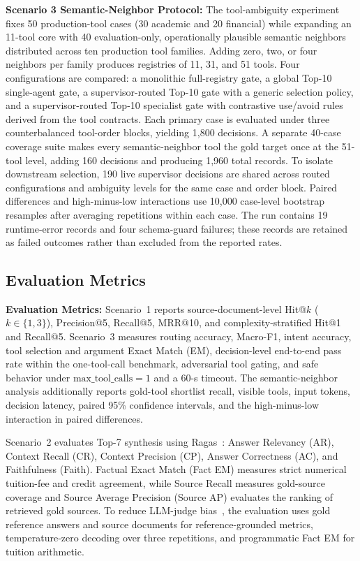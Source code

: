 \noindent\textbf{Scenario 3 Semantic-Neighbor Protocol:} The tool-ambiguity experiment fixes 50 production-tool cases (30 academic and 20 financial) while expanding an 11-tool core with 40 evaluation-only, operationally plausible semantic neighbors distributed across ten production tool families. Adding zero, two, or four neighbors per family produces registries of 11, 31, and 51 tools. Four configurations are compared: a monolithic full-registry gate, a global Top-10 single-agent gate, a supervisor-routed Top-10 gate with a generic selection policy, and a supervisor-routed Top-10 specialist gate with contrastive use/avoid rules derived from the tool contracts. Each primary case is evaluated under three counterbalanced tool-order blocks, yielding 1,800 decisions. A separate 40-case coverage suite makes every semantic-neighbor tool the gold target once at the 51-tool level, adding 160 decisions and producing 1,960 total records. To isolate downstream selection, 190 live supervisor decisions are shared across routed configurations and ambiguity levels for the same case and order block. Paired differences and high-minus-low interactions use 10,000 case-level bootstrap resamples after averaging repetitions within each case. The run contains 19 runtime-error records and four schema-guard failures; these records are retained as failed outcomes rather than excluded from the reported rates.

\subsection{Evaluation Metrics}
\label{sec:metrics}

\noindent\textbf{Evaluation Metrics:} Scenario~1 reports source-document-level Hit@$k$ ($k\in\{1,3\}$), Precision@5, Recall@5, MRR@10, and complexity-stratified Hit@1 and Recall@5. Scenario~3 measures routing accuracy, Macro-F1, intent accuracy, tool selection and argument Exact Match (EM), decision-level end-to-end pass rate within the one-tool-call benchmark, adversarial tool gating, and safe behavior under $\text{max\_tool\_calls}=1$ and a $60$-s timeout. The semantic-neighbor analysis additionally reports gold-tool shortlist recall, visible tools, input tokens, decision latency, paired 95\% confidence intervals, and the high-minus-low interaction in paired differences.

Scenario~2 evaluates Top-7 synthesis using Ragas~\cite{es2023ragas}: Answer Relevancy (AR), Context Recall (CR), Context Precision (CP), Answer Correctness (AC), and Faithfulness (Faith). Factual Exact Match (Fact EM) measures strict numerical tuition-fee and credit agreement, while Source Recall measures gold-source coverage and Source Average Precision (Source AP) evaluates the ranking of retrieved gold sources. To reduce LLM-judge bias~\cite{zheng2023judging,es2023ragas}, the evaluation uses gold reference answers and source documents for reference-grounded metrics, temperature-zero decoding over three repetitions, and programmatic Fact EM for tuition arithmetic.

